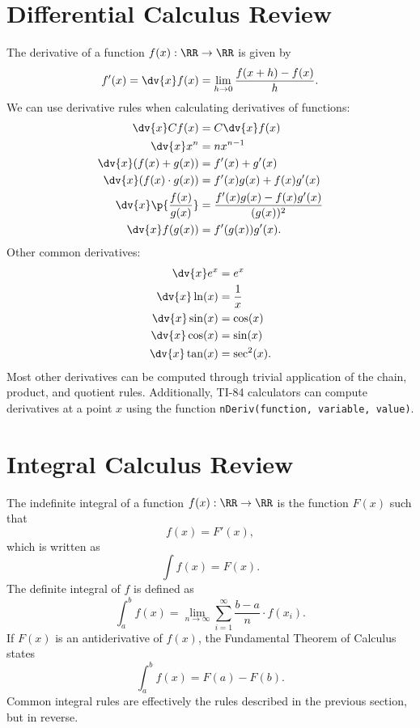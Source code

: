\documentclass[11pt]{article}
\begin{document}
\section{Differential Calculus Review}
The derivative of a function $f(x):\RR\to\RR$ is given by
\begin{equation}
    f'(x) = \dv{x} f(x) = \lim_{h\to 0}\frac{f(x+h) - f(x)}{h}.
\end{equation}
We can use  derivative rules when calculating derivatives of functions:
\begin{align}
    \dv{x} Cf(x) &= C\dv{x} f(x) \\
    \dv{x} x^n &= nx^{n-1} \\
    \dv{x} (f(x) + g(x)) &= f'(x) + g'(x) \\
    \dv{x} (f(x) \cdot g(x)) &= f'(x)g(x) + f(x)g'(x) \\
    \dv{x} \p{\frac{f(x)}{g(x)}} &= \frac{f'(x)g(x) - f(x)g'(x)}{(g(x))^2} \\
    \dv{x} f(g(x)) &= f'(g(x))g'(x).
\end{align}
Other common derivatives:
\begin{align}
    \dv{x} e^{x} &= e^x \\
    \dv{x} \ln(x) &= \frac{1}{x} \\
    \dv{x} \sin(x) &= \cos(x) \\
    \dv{x} \cos(x) &= \sin(x) \\
    \dv{x} \tan(x) &= \sec^2(x).
\end{align}
Most other derivatives can be computed through trivial application of the chain, product, and quotient rules. Additionally, TI-84 calculators can compute derivatives at a point $x$ using the function \texttt{nDeriv(function, variable, value)}.

\section{Integral Calculus Review}
The indefinite integral of a function $f(x):\RR\to\RR$ is the function $F(x)$ such that
\begin{equation}
    f(x) = F'(x),
\end{equation}
which is written as
\begin{equation}
    \int f(x) = F(x).
\end{equation}
The definite integral of $f$ is defined as
\begin{equation}
    \int_a^b f(x) = \lim_{n \to\infty}\sum_{i=1}^{\infty} \frac{b-a}{n}\cdot f(x_i).
\end{equation}
If $F(x)$ is an antiderivative of $f(x)$, the Fundamental Theorem of Calculus states
\begin{equation}
    \int_a^b f(x) = F(a) - F(b).
\end{equation}
Common integral rules are effectively the rules described in the previous section, but in reverse.
\end{document}
